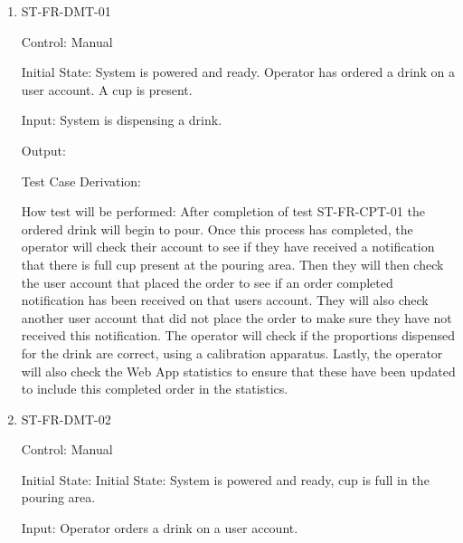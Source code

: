 \documentclass[12pt, titlepage]{article}
\begin{document}
\begin{enumerate}

\item{ST-FR-DMT-01\\}

Control: Manual
					
Initial State: System is powered and ready. Operator has ordered a drink on a user account. A cup is present.
					
Input: System is dispensing a drink.
					
Output: 

Test Case Derivation: 
					
How test will be performed: After completion of test ST-FR-CPT-01 the ordered drink will begin to pour. Once this process has completed, the operator will check their account to see if they have received a notification that there is full cup present at the pouring area. Then they will then check the user account that placed the order to see if an order completed notification has been received on that users account. They will also check another user account that did not place the order to make sure they have not received this notification. The operator will check if the proportions dispensed for the drink are correct, using a calibration apparatus. Lastly, the operator will also check the Web App statistics to ensure that these have been updated to include this completed order in the statistics.

\item{ST-FR-DMT-02\\}

Control: Manual

Initial State: Initial State: System is powered and ready, cup is full in the pouring area.

Input: Operator orders a drink on a user account.


\end{enumerate}
\end{document}
